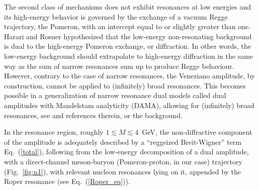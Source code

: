 \documentclass[12pt]{article}
\begin{document}
The second class of mechanisms does not exhibit resonances at low
energies and its high-energy behavior is governed by the exchange
of a vacuum Regge trajectory, the Pomeron, with an intercept equal
to or slightly greater than one. Harari and Rosner \cite{H_R}
hypothesized that the low-energy non-resonating background is dual
to the high-energy Pomeron exchange, or diffraction. In other
words, the low-energy background should extrapolate to high-energy
diffraction in the same way as the sum of narrow resonances sum up
to produce Regge behaviour. However, contrary to the case of
narrow resonances, the Veneziano amplitude, by construction,
cannot be applied to (infinitely) broad resonances. This becomes
possible in a generalization of narrow resonance dual models
called dual amplitudes with Mandelstam analyticity (DAMA),
allowing for (infinitely) broad resonances, see \cite{DAMA} and references therein, or
the background.


In the resonance region, roughly $1\lesssim M\lesssim 4$~GeV, the non-diffractive component of the amplitude is adequately described by a ``reggeized Breit-Wigner'' term  Eq.~(\ref{total}), following from the low-energy decomposition of a dual amplitude, with a direct-channel meson-baryon (Pomeron-proton, in our case) trajectory (Fig.~\ref{fig:n1}), with relevant nucleon resonances lying on it, appended by the Roper resonance (see Eq.~(\ref{Roper_eq})).

 
\end{document}
